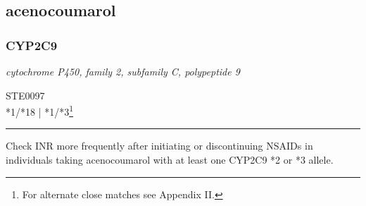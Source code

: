 \documentclass{report}
\begin{document}
      \normalsize























\subsection{ acenocoumarol }

\subsubsection{ CYP2C9 }
     \textit{ cytochrome P450, family 2, subfamily C, polypeptide 9 } \begin{flushright} \textsc{ STE0097 \\ *1/*18  | *1/*3\footnote{For alternate close matches see Appendix II.} }\end{flushright}
      \hrule \vspace{6pt}
      Check INR more frequently after initiating or discontinuing NSAIDs in individuals taking acenocoumarol with at least one CYP2C9 *2 or *3 allele. \newline
      \scriptsize
      
\end{document}
